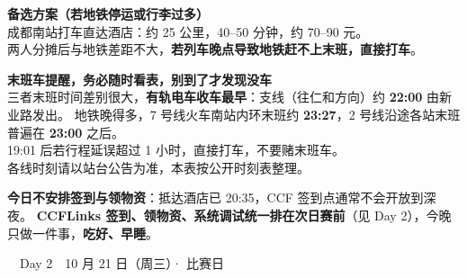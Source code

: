 \documentclass[11pt,a4paper,fontset=windows]{ctexart}
\newcommand{\daytitle}[2]{%
  \vspace{0.7em}
  {\large\bfseries\color{white}\colorbox{main}{\strut\ \ #1\ \ \normalsize #2\ \ }}%
  \vspace{0.35em}\par}
\begin{document}
\begin{keybox}
\textbf{备选方案（若地铁停运或行李过多）}\\
成都南站打车直达酒店：约 25 公里，40--50 分钟，约 70--90 元。\\
两人分摊后与地铁差距不大，\textbf{若列车晚点导致地铁赶不上末班，直接打车}。
\end{keybox}

\begin{warnbox}
\textbf{末班车提醒，务必随时看表，别到了才发现没车}\\
三者末班时间差别很大，\textbf{有轨电车收车最早}：支线（往仁和方向）约 \textbf{22:00} 由新业路发出。
地铁晚得多，7 号线火车南站内环末班约 \textbf{23:27}，2 号线沿途各站末班普遍在 \textbf{23:00} 之后。\\
19:01 后若行程延误超过 1 小时，直接打车，不要赌末班车。\\
{\small\color{graytx} 各线时刻请以站台公告为准，本表按公开时刻表整理。}
\end{warnbox}

\begin{keybox}
\textbf{今日不安排签到与领物资}：抵达酒店已 20:35，CCF 签到点通常不会开放到深夜。
\textbf{CCFLinks 签到、领物资、系统调试统一排在次日赛前}（见 Day 2），今晚只做一件事，\textbf{吃好、早睡}。
\end{keybox}

\newpage
\daytitle{Day 2}{10 月 21 日（周三）· 比赛日}
\end{document}
